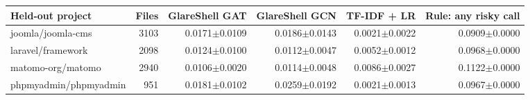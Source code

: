 \begin{tabular}{@{}lrrrrr@{}}
\toprule
Held-out project & Files & GlareShell GAT & GlareShell GCN & TF-IDF + LR & Rule: any risky call \\ \midrule
joomla/joomla-cms & 3103 & 0.0171$\pm$0.0109 & 0.0186$\pm$0.0143 & 0.0021$\pm$0.0022 & 0.0909$\pm$0.0000 \\
laravel/framework & 2098 & 0.0124$\pm$0.0100 & 0.0112$\pm$0.0047 & 0.0052$\pm$0.0012 & 0.0968$\pm$0.0000 \\
matomo-org/matomo & 2940 & 0.0106$\pm$0.0020 & 0.0114$\pm$0.0048 & 0.0086$\pm$0.0027 & 0.1122$\pm$0.0000 \\
phpmyadmin/phpmyadmin & 951 & 0.0181$\pm$0.0102 & 0.0259$\pm$0.0192 & 0.0021$\pm$0.0013 & 0.0967$\pm$0.0000 \\
\bottomrule
\end{tabular}
